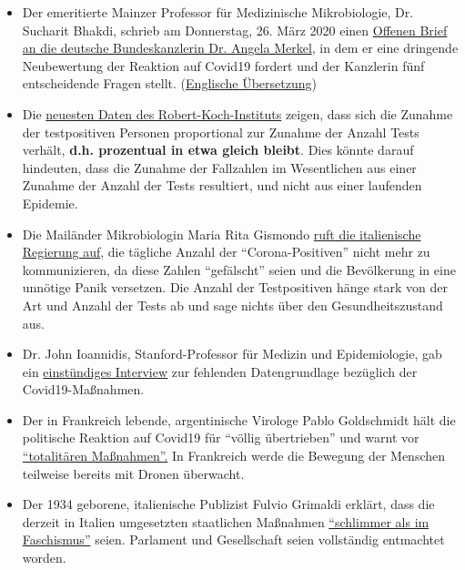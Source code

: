 \begin{itemize}
\tightlist
\item
  Der emeritierte Mainzer Professor für Medizinische Mikrobiologie, Dr.
  Sucharit Bhakdi, schrieb am Donnerstag, 26. März 2020 einen
  \href{https://swprs.org/offener-brief-von-professor-sucharit-bhakdi-an-bundeskanzlerin-dr-angela-merkel/}{Offenen
  Brief an die deutsche Bundeskanzlerin Dr. Angela Merkel}, in dem er
  eine dringende Neubewertung der Reaktion auf Covid19 fordert und der
  Kanzlerin fünf entscheidende Fragen stellt.
  (\href{https://swprs.org/open-letter-from-professor-sucharit-bhakdi-to-german-chancellor-dr-angela-merkel/}{Englische
  Übersetzung})
\item
  Die
  \href{https://multipolar-magazin.de/artikel/coronavirus-irrefuhrung-fallzahlen}{neuesten
  Daten des Robert-Koch-Instituts} zeigen, dass sich die Zunahme der
  testpositiven Personen proportional zur Zunahme der Anzahl Tests
  verhält, \textbf{d.h. prozentual in etwa gleich bleibt}. Dies könnte
  darauf hindeuten, dass die Zunahme der Fallzahlen im Wesentlichen aus
  einer Zunahme der Anzahl der Tests resultiert, und nicht aus einer
  laufenden Epidemie.
\item
  Die Mailänder Mikrobiologin Maria Rita Gismondo
  \href{https://www.secoloditalia.it/2020/03/coronavirus-la-gismondo-ammonisce-duramente-basta-snocciolare-numeri-sui-positivi-sono-dati-falsati/}{ruft
  die italienische Regierung auf}, die tägliche Anzahl der
  ``Corona-Positiven'' nicht mehr zu kommunizieren, da diese Zahlen
  ``gefälscht'' seien und die Bevölkerung in eine unnötige Panik
  versetzen. Die Anzahl der Testpositiven hänge stark von der Art und
  Anzahl der Tests ab und sage nichts über den Gesundheitszustand aus.
\item
  Dr. John Ioannidis, Stanford-Professor für Medizin und Epidemiologie,
  gab ein
  \href{https://www.youtube.com/watch?v=d6MZy-2fcBw}{einstündiges
  Interview} zur fehlenden Datengrundlage bezüglich der
  Covid19-Maßnahmen.
\item
  Der in Frankreich lebende, argentinische Virologe Pablo Goldschmidt
  hält die politische Reaktion auf Covid19 für ``völlig übertrieben''
  und warnt vor
  \href{https://www.infobae.com/coronavirus/2020/03/28/para-un-prestigioso-cientifico-argentino-el-coronavirus-no-merece-que-el-planeta-este-en-un-estado-de-parate-total/}{``totalitären
  Maßnahmen''.} In Frankreich werde die Bewegung der Menschen teilweise
  bereits mit Dronen überwacht.
\item
  Der 1934 geborene, italienische Publizist Fulvio Grimaldi erklärt,
  dass die derzeit in Italien umgesetzten staatlichen Maßnahmen
  \href{https://www.youtube.com/watch?v=O3BuNp01vpc}{``schlimmer als im
  Faschismus''} seien. Parlament und Gesellschaft seien vollständig
  entmachtet worden.
\end{itemize}

